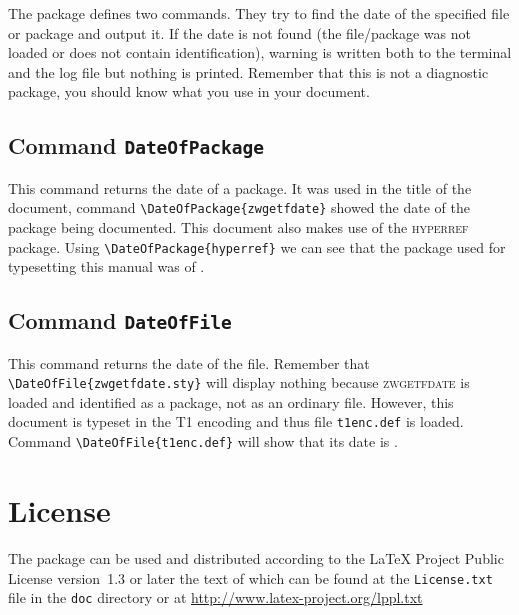 \documentclass[11pt]{article}
\DeclareRobustCommand\cmd[1]{\texttt{\Bslash#1}}
\begin{document}
The package defines two commands. They try to find the date of the specified file or package and
output it. If the date is not found (the file/package was not loaded or does not contain
identification), warning is written both to the terminal and the log file but nothing is printed.
Remember that this is not a diagnostic package, you should know what you use in your document.

\subsection{Command \cmd{DateOfPackage}}
This command returns the date of a package. It was used in the title of the document, command
\verb;\DateOfPackage{zwgetfdate}; showed the date of the package being documented. This document
also makes use of the \textsc{hyperref} package. Using \verb;\DateOfPackage{hyperref}; we can see
that the package used for typesetting this manual was of .

\subsection{Command \cmd{DateOfFile}}
This command returns the date of the file. Remember that \verb;\DateOfFile{zwgetfdate.sty}; will
display nothing because \textsc{zwgetfdate} is loaded and identified as a package, not as an
ordinary file. However, this document is typeset in the T1 encoding and thus file
\texttt{t1enc.def} is loaded. Command \verb;\DateOfFile{t1enc.def}; will show that its date is
.

\section{License}
The package can be used and distributed according to the LaTeX Project Public License version~1.3 or later the
text of which can be found at the \texttt{License.txt} file in the \texttt{doc} directory or at
\url{http://www.latex-project.org/lppl.txt}
\end{document}
